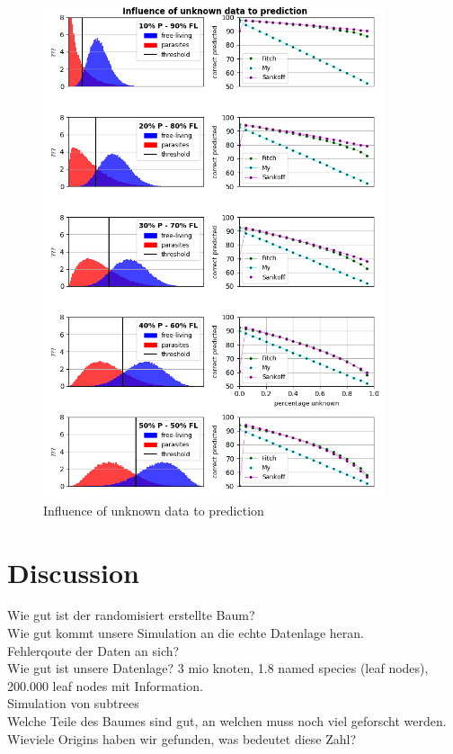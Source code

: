   \begin{figure}
    \caption{Influence of unknown data to prediction}
    \centering
    \includegraphics[width=0.9\textwidth]{Figures/simulation_evaluation_1.png}
  \end{figure}
  

\chapter{Discussion}
  Wie gut ist der randomisiert erstellte Baum? \\
  Wie gut kommt unsere Simulation an die echte Datenlage heran. \\
  Fehlerqoute der Daten an sich? \\
  Wie gut ist unsere Datenlage? 3 mio knoten, 1.8 named species (leaf nodes), 200.000 leaf nodes mit 
  Information. \\
  Simulation von subtrees \\
  Welche Teile des Baumes sind gut, an welchen muss noch viel geforscht werden. \\
  Wieviele Origins haben wir gefunden, was bedeutet diese Zahl? \\
  
